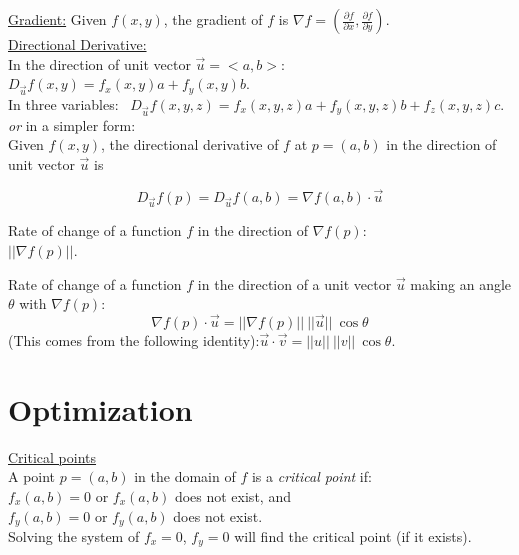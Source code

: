 \documentclass[10pt]{article}
\begin{document}
\noindent
\underline{Gradient:} Given $f(x,y)$, the gradient of $f$ is $\nabla f = \left(\frac{\partial{f}}{\partial{x}},\frac{\partial{f}}{\partial{y}}\right)$.\\

\noindent
\underline{Directional Derivative:}\\
In the direction of unit vector $\vec{u}=<a,b>$: \ ${D_{\vec u}}f\left( {x,y} \right) = {f_x}\left( {x,y} \right)a + {f_y}\left( {x,y} \right)b$.\\

In three variables: \ ${D_{\vec u}}f\left( {x,y,z} \right) = {f_x}\left( {x,y,z} \right)a + {f_y}\left( {x,y,z} \right)b + {f_z}\left( {x,y,z} \right)c$.\\
\emph{or} in a simpler form:\\
Given $f(x,y)$, the directional derivative of $f$ at $p = (a,b)$ in the direction of unit vector $\vec{u}$ is

$$
{D_{\vec u}}f\left( {p} \right) = {D_{\vec u}}f\left( {a,b} \right) = \nabla f(a,b) \cdot \vec{u}
$$

Rate of change of a function $f$ in the direction of $\nabla f(p)$:\\$||\nabla f(p)||$.

Rate of change of a function $f$ in the direction of a unit vector $\vec{u}$ making an angle $\theta$ with $\nabla f(p)$:\\
$$
\nabla f(p) \cdot \vec{u} = ||\nabla f(p)|| \ ||\vec{u}|| \ \cos \theta
$$
(This comes from the following identity):$\vec{u} \cdot \vec{v} = ||u|| \ ||v|| \ \cos \theta$.

\section*{Optimization}
\underline{Critical points}\\
A point $p = (a,b)$ in the domain of $f$ is a \emph{critical point} if:\\
$f_x(a,b) = 0$ or $f_x(a,b)$ does not exist, and\\
$f_y(a,b) = 0$ or $f_y(a,b)$ does not exist.\\

Solving the system of $f_x = 0$, $f_y = 0$ will find the critical point (if it exists).\\
\end{document}
